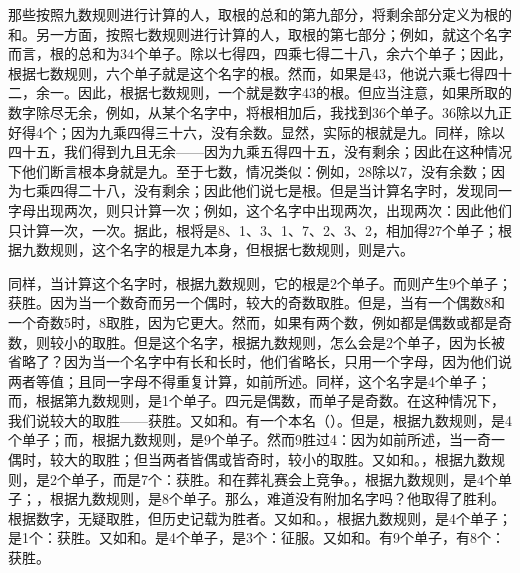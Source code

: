 那些按照九数规则进行计算的人，取根的总和的第九部分，将剩余部分定义为根的和。另一方面，按照七数规则进行计算的人，取根的第七部分；例如，就这个名字而言，根的总和为34个单子。除以七得四，四乘七得二十八，余六个单子；因此，根据七数规则，六个单子就是这个名字的根。然而，如果是43，他说六乘七得四十二，余一。因此，根据七数规则，一个就是数字43的根。但应当注意，如果所取的数字除尽无余，例如，从某个名字中，将根相加后，我找到36个单子。36除以九正好得4个；因为九乘四得三十六，没有余数。显然，实际的根就是九。同样，除以四十五，我们得到九且无余——因为九乘五得四十五，没有剩余；因此在这种情况下他们断言根本身就是九。至于七数，情况类似：例如，28除以7，没有余数；因为七乘四得二十八，没有剩余；因此他们说七是根。但是当计算名字时，发现同一字母出现两次，则只计算一次；例如，这个名字中出现两次，出现两次：因此他们只计算一次，一次。据此，根将是8、1、3、1、7、2、3、2，相加得27个单子；根据九数规则，这个名字的根是九本身，但根据七数规则，则是六。\par

同样，当计算这个名字时，根据九数规则，它的根是2个单子。而则产生9个单子；获胜。因为当一个数奇而另一个偶时，较大的奇数取胜。但是，当有一个偶数8和一个奇数5时，8取胜，因为它更大。然而，如果有两个数，例如都是偶数或都是奇数，则较小的取胜。但是这个名字，根据九数规则，怎么会是2个单子，因为长被省略了？因为当一个名字中有长和长时，他们省略长，只用一个字母，因为他们说两者等值；且同一字母不得重复计算，如前所述。同样，这个名字是4个单子；而，根据第九数规则，是1个单子。四元是偶数，而单子是奇数。在这种情况下，我们说较大的取胜——获胜。又如和。有一个本名（）。但是，根据九数规则，是4个单子；而，根据九数规则，是9个单子。然而9胜过4：因为如前所述，当一奇一偶时，较大的取胜；但当两者皆偶或皆奇时，较小的取胜。又如和。，根据九数规则，是2个单子，而是7个：获胜。和在葬礼赛会上竞争。，根据九数规则，是4个单子；，根据九数规则，是8个单子。那么，难道没有附加名字吗？他取得了胜利。根据数字，无疑取胜，但历史记载为胜者。又如和。，根据九数规则，是4个单子；是1个：获胜。又如和。是4个单子，是3个：征服。又如和。有9个单子，有8个：获胜。\par

